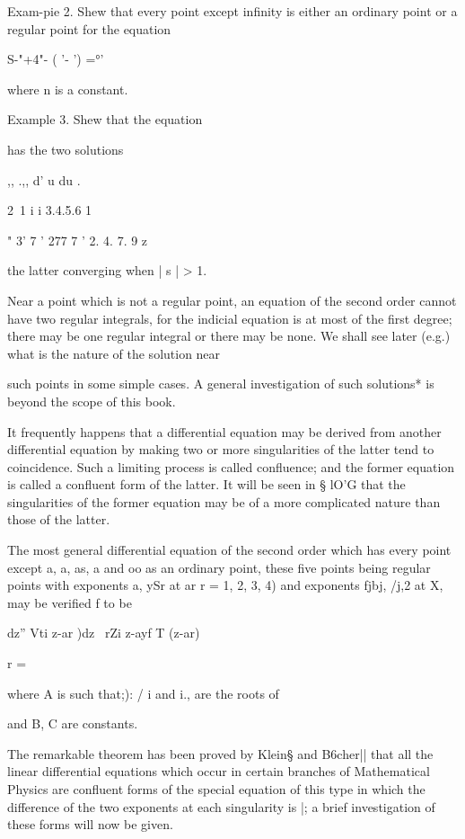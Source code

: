Exam-pie 2. Shew that every point except infinity is either an
ordinary point or a regular point for the equation

 S-"+4"- ( '- ') =°'

where n is a constant.

Example 3. Shew that the equation

has the two solutions

,, .,, d' u du .

2\ 1 i i 3.4.5.6 1

 " 3' 7 ' 277 7 ' 2. 4. 7. 9 z

the latter converging when | s | > 1.


Near a point which is not a regular point, an equation of the second
order cannot have two regular integrals, for the indicial equation is
at most of the first degree; there may be one regular integral or
there may be none. We shall see later (e.g.) what is the nature
of the solution near

%
%

such points in some simple cases. A general investigation of such
solutions* is beyond the scope of this book.

It frequently happens that a differential equation may be derived from
another differential equation by making two or more singularities of
the latter tend to coincidence. Such a limiting process is called
confluence; and the former equation is called a confluent form of the
latter. It will be seen in § lO'G that the singularities of the former
equation may be of a more complicated nature than those of the latter.


The most general differential equation of the second order which has
every point except a, a, as, a and oo as an ordinary point, these
five points being regular points with exponents a, ySr at ar r = 1,
2, 3, 4) and exponents fjbj, /j,2 at X, may be verified f to be

dz'' Vti z-ar )dz \ rZi z-ayf T (z-ar)

r = \

where A is such that;): / i and i., are the roots of

and B, C are constants.

The remarkable theorem has been proved by Klein§ and B6cher|| that all
the linear differential equations which occur in certain branches of
Mathematical Physics are confluent forms of the special equation of
this type in which the difference of the two exponents at each
singularity is |; a brief investigation of these forms will now be
given.

